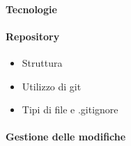 		

		\paragraph{Tecnologie}
		\paragraph{Repository}
			\begin{itemize}
				\item Struttura
				\item Utilizzo di git
				\item Tipi di file e .gitignore
			\end{itemize}
		\paragraph{Gestione delle modifiche}

	